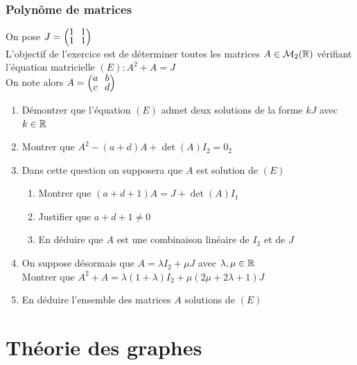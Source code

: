 \documentclass[oneside,12pt]{book}          %
\begin{document}
\subsection{Polynôme de matrices}
On pose $J=\matrice{1&1\\1&1}$ \\
L'objectif de l'exercice est de déterminer toutes les matrices $A\in\mathcal{M}_2({\mathbb R})$ vérifiant l'équation matricielle $(E) : A^2+A=J$ \\
On note alors $A=\matrice{a&b\\c&d}$
\begin{enumerate}
    \item Démontrer que l'équation $(E)$ admet deux solutions de la forme $kJ$ avec $k\in{\mathbb R}$
    \item Montrer que $A^2-(a+d)A+\det(A)I_2=0_2$
    \item Dans cette question on supposera que $A$ est solution de $(E)$
    \begin{enumerate}
        \item Montrer que $(a+d+1)A=J+\det(A)I_1$
        \item Justifier que $a+d+1\neq0$
        \item En déduire que $A$ est une combinaison linéaire de $I_2$ et de $J$
    \end{enumerate}
    \item On suppose désormais que $A=\lambda I_2+\mu J$ \quad avec $\lambda,\mu\in{\mathbb R}$\\[5pt]
    Montrer que $A^2+A=\lambda(1+\lambda)I_2+\mu(2\mu+2\lambda+1)J$
    \item En déduire l'ensemble des matrices $A$ solutions de $(E)$
\end{enumerate}




\chapter{Théorie des graphes}
\newpage
\end{document}
